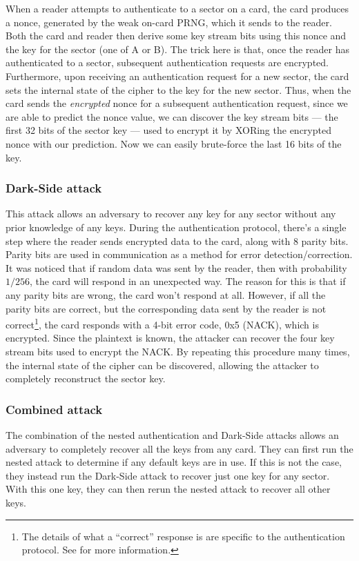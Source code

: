 \documentclass[12pt,a4paper,twoside,openright]{report}
\begin{document}
When a reader attempts to authenticate to a sector on a card, the card produces a nonce, generated by the weak on-card PRNG, which it sends to the reader. Both the card and reader then derive some key stream bits using this nonce and the key for the sector (one of A or B). The trick here is that, once the reader has authenticated to a sector, subsequent authentication requests are encrypted. Furthermore, upon receiving an authentication request for a new sector, the card sets the internal state of the cipher to the key for the new sector. Thus, when the card sends the \emph{encrypted} nonce for a subsequent authentication request, since we are able to predict the nonce value, we can discover the key stream bits --- the first 32 bits of the sector key --- used to encrypt it by XORing the encrypted nonce with our prediction. Now we can easily brute-force the last 16 bits of the key.

\subsubsection{Dark-Side attack}

This attack allows an adversary to recover any key for any sector without any prior knowledge of any keys. During the authentication protocol, there's a single step where the reader sends encrypted data to the card, along with 8 parity bits. Parity bits are used in communication as a method for error detection/correction. It was noticed that if random data was sent by the reader, then with probability $1/256$, the card will respond in an unexpected way. The reason for this is that if any parity bits are wrong, the card won't respond at all. However, if all the parity bits are correct, but the corresponding data sent by the reader is not correct\footnote{The details of what a ``correct'' response is are specific to the authentication protocol. See \cite{darkside} for more information.}, the card responds with a 4-bit error code, 0x5 (NACK), which is encrypted. Since the plaintext is known, the attacker can recover the four key stream bits used to encrypt the NACK. By repeating this procedure many times, the internal state of the cipher can be discovered, allowing the attacker to completely reconstruct the sector key.

\subsubsection{Combined attack}

The combination of the nested authentication and Dark-Side attacks allows an adversary to completely recover all the keys from any card. They can first run the nested attack to determine if any default keys are in use. If this is not the case, they instead run the Dark-Side attack to recover just one key for any sector. With this one key, they can then rerun the nested attack to recover all other keys.
\end{document}
